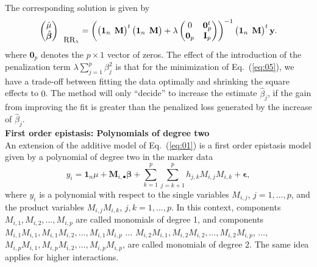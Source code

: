 \documentclass{bmcart}
\newcommand{\M}{\mathbf{M}}
\newcommand{\0}{\mathbf{0}}
\begin{document}
The corresponding solution is given by 
\begin{equation}
	\begin{pmatrix}
		\hat{\mu} \\
		\hat{\bm{\beta}}
	\end{pmatrix}_{\mbox{\small RR}_\lambda} =
	\left( 
	\begin{pmatrix}
		\mathbf{1}_n & \hspace{-0.2cm}\M
	\end{pmatrix}^{t}
	\begin{pmatrix}
		\mathbf{1}_n & \hspace{-0.2cm} \M
	\end{pmatrix} + \lambda \begin{pmatrix}
		0 & \mathbf{0 }_p^t \\
		\mathbf{0 }_p & \mathbf{I}_p
	\end{pmatrix} 
	\right)^{-1} 
	\begin{pmatrix}
		\mathbf{1}_n & \hspace{-0.2cm} \M
	\end{pmatrix}^{t}
	\mathbf{y}. \label{eq:06}
\end{equation}
where $\mathbf{0 }_p$ denotes the $p \times 1$ vector of zeros. The effect of the introduction of the penalization term $\lambda \sum\limits_{j=1}^p {\beta}_j^2$ is that for the minimization of Eq.~(\ref{eq:05}), we have a trade-off between fitting the data optimally and shrinking the square effects to $0$. The method will only ``decide'' to increase the estimate $\hat{\beta}_j$, if the gain from improving the fit is greater than the penalized loss generated by the increase of $\hat{\beta}_j$.  \vspace{0.4cm} \\
{\bf First order epistasis: Polynomials of degree two}\vspace{0.2cm}\\ 
An extension of the additive model of Eq.~(\ref{eq:01}) is a first order epistasis model given by a polynomial of degree two in the marker data \cite{ober15,jiang15,Martini16}
\begin{equation} \label{eq:07}
	y_i =\mathbf{1}_n \mu + \M_{i,\bullet}\bm{\beta} + \sum\limits_{k=1}^p\sum\limits_{j=k+1}^p h_{j,k}M_{i,j}M_{i,k} + \bm{\epsilon},
\end{equation}
where $y_i$ is a polynomial with respect to  the single variables $M_{i,j}$, $j=1,\dots,p$, and the  product variables $M_{i,j}M_{i,k}$, $j,k=1,\dots,p$. In this context,  components $M_{i,1},M_{i,2},\dots,M_{i,p}$ are called monomials of degree 1, and components $M_{i,1}M_{i,1},M_{i,1}M_{i,2},\dots, M_{i,1}M_{i,p}$ $\dots$ $M_{i,2}M_{i,1},M_{i,2}M_{i,2},\dots, M_{i,2}M_{i,p}$, $\dots$, $M_{i,p}M_{i,1},M_{i,p}M_{i,2},\dots, M_{i,p}M_{i,p}$,  are called monomials of degree 2. The same idea applies for higher interactions. \\
\end{document}
